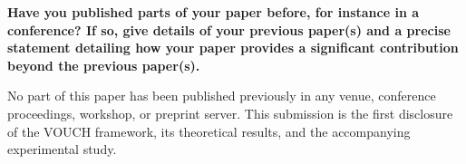 \documentclass[10pt]{article}
\begin{document}
\vspace{2pt}
\noindent\textbf{Have you published parts of your paper before, for instance in a
conference? If so, give details of your previous paper(s) and a precise statement
detailing how your paper provides a significant contribution beyond the previous
paper(s).}

No part of this paper has been published previously in any venue, conference
proceedings, workshop, or preprint server. This submission is the first disclosure
of the VOUCH framework, its theoretical results, and the accompanying experimental
study.
\end{document}
